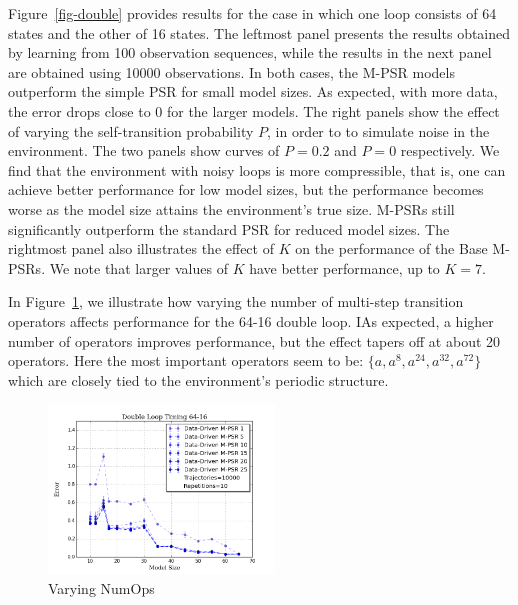 
Figure~\ref{fig-double} provides results for the case in which one loop consists of 64 states and the other of 16 states. The leftmost panel presents the results obtained by learning from  100 observation sequences, while the results in the next panel are obtained using 10000 observations. In both cases, the M-PSR models outperform the simple PSR for small model sizes.  As expected, with more data, the error drops close to 0 for the larger models.  The right panels show the effect of 
varying the self-transition probability $P$, in order to to simulate noise in the environment. The two panels show curves of $P=0.2$ and $P=0$ respectively. We find that the environment with noisy loops is more compressible, that is, one can achieve better performance for low model sizes, but the performance becomes worse as the model size attains the environment's true size. M-PSRs still significantly outperform the standard PSR for reduced model sizes.  The rightmost panel also illustrates the effect of $K$ on the performance of the Base M-PSRs. We note that larger values of $K$ have better performance, up to $K=7$.



In Figure~\ref{fig-numops}, we illustrate how varying the number of multi-step transition operators affects performance for the 64-16 double loop. IAs expected, a higher number of operators improves performance, but the effect tapers off  at about 20 operators. Here the most important operators seem to be: $\{a,a^{8},a^{24},a^{32},a^{72}\}$ which are closely tied to the environment's periodic structure.

\begin{figure}[ht!]
\centering
\includegraphics[width=60mm]{uCOREPICS/DL/NumOpsTiming.png}
\caption{Varying NumOps\label{fig-numops}}
\end{figure} 




